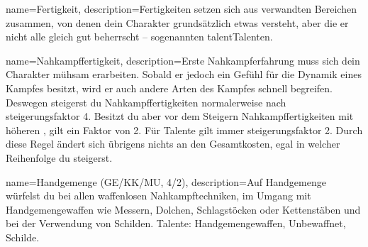         
        
        
    
        
        
        
        
    

{
    name={Fertigkeit},
    description={Fertigkeiten setzen sich aus verwandten Bereichen zusammen, von denen dein Charakter grundsätzlich etwas versteht, aber die er nicht alle gleich gut beherrscht – sogenannten \gls{talent}{Talenten}.}}

{
    name={Nahkampffertigkeit},
    description={Erste Nahkampferfahrung muss sich dein Charakter mühsam erarbeiten. Sobald er jedoch ein Gefühl für die Dynamik eines Kampfes besitzt, wird er auch andere Arten des Kampfes schnell begreifen. Deswegen steigerst du Nahkampffertigkeiten normalerweise nach \gls{steigerungsfaktor} 4. Besitzt du aber vor dem Steigern Nahkampffertigkeiten mit höheren , gilt ein Faktor von 2. Für Talente gilt immer \gls{steigerungsfaktor} 2. Durch diese Regel ändert sich übrigens nichts an den Gesamtkosten, egal in welcher Reihenfolge du steigerst.}}

{
    name={Handgemenge (GE/KK/MU, 4/2)},
    description={Auf Handgemenge würfelst du bei allen waffenlosen Nahkampftechniken, im Umgang mit Handgemengewaffen wie Messern, Dolchen, Schlagstöcken oder Kettenstäben und bei der Verwendung von Schilden. Talente: Handgemengewaffen, Unbewaffnet, Schilde.}}

